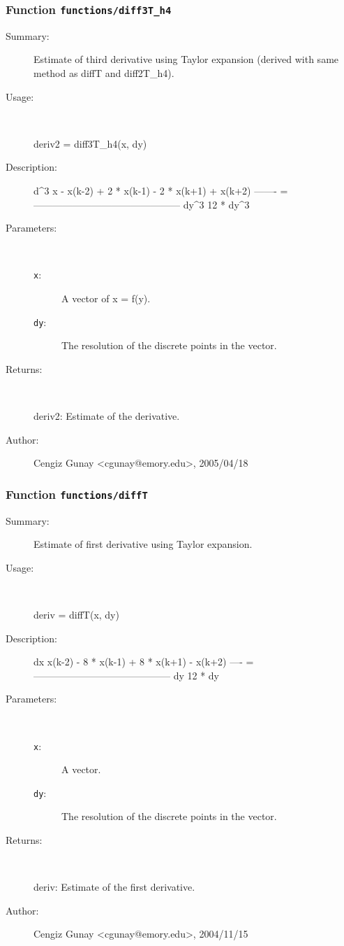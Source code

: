 \subsubsection[Function \texttt{diff3T\_h4}]{Function \texttt{functions/diff3T\_h4}}%
%
\label{ref_functions__diff3T_h4}%
\hypertarget{ref_functions__diff3T_h4}{}%
\begin{description}
\item[Summary:]Estimate of third derivative using Taylor expansion (derived with same method as diffT and diff2T\_h4).
%
\item[Usage:]~%
\begin{lyxcode}%
deriv2 = diff3T\_h4(x, dy)
%
\end{lyxcode}%
%
\item[Description:]%
d\textasciicircum{}3 x     - x(k-2) + 2 * x(k-1) - 2 * x(k+1) + x(k+2)
  ------- = ---------------------------------------------
   dy\textasciicircum{}3			12 * dy\textasciicircum{}3
\item[Parameters:]~
\begin{description}%
\item[\texttt{x}:]
 A vector of x = f(y).
\item[\texttt{dy}:]
 The resolution of the discrete points in the vector.
\end{description}%
%
\item[Returns:
]~

 	deriv2: Estimate of the derivative.
%
%
%
\item[Author:]%
Cengiz Gunay <cgunay@emory.edu>, 2005/04/18
%
\end{description}
\methodline%
\subsubsection[Function \texttt{diffT}]{Function \texttt{functions/diffT}}%
%
\label{ref_functions__diffT}%
\hypertarget{ref_functions__diffT}{}%
\begin{description}
\item[Summary:]Estimate of first derivative using Taylor expansion.
%
\item[Usage:]~%
\begin{lyxcode}%
deriv = diffT(x, dy)
%
\end{lyxcode}%
%
\item[Description:]%
dx     x(k-2) - 8 * x(k-1) + 8 * x(k+1) - x(k+2)
  ---- = ------------------------------------------
   dy			12 * dy
\item[Parameters:]~
\begin{description}%
\item[\texttt{x}:]
 A vector.
\item[\texttt{dy}:]
 The resolution of the discrete points in the vector.
\end{description}%
%
\item[Returns:
]~

 	deriv: Estimate of the first derivative.
%
%
%
\item[Author:]%
Cengiz Gunay <cgunay@emory.edu>, 2004/11/15
%
\end{description}
\methodline%
